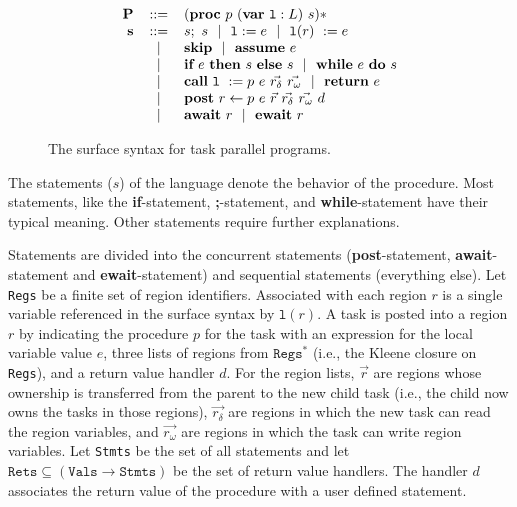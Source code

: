 \begin{figure}
  \begin{center}
\[
  \begin{array}{rcl}
\textbf{P} &::=& (\textbf{proc}~p~(\textbf{var}\ \texttt{l} : L)~s)* \\
\textbf{s} &::=& s;~s \alt \texttt{l} := e \alt \texttt{l}(r)\ := e \\
&\alt& \textbf{skip} \alt  \textbf{assume}~e \\
&\alt& \textbf{if}~e~\textbf{then}~s~\textbf{else}~s \alt \textbf{while}~e~\textbf{do}~s \\
&\alt& \textbf{call}~\texttt{l}\ := p~e~\vec{r_\delta}~\vec{r_\omega} \alt \textbf{return}~e \\
&\alt& \textbf{post}~r \leftarrow p~e~\vec{r}~\vec{r_\delta}~\vec{r_\omega}~d \\
&\alt& \textbf{await}~r \alt \textbf{ewait}~r \\
  \end{array}
\]
  \end{center}
  \caption{The surface syntax for task parallel programs.}
  \vspace{-1em}
  \label{fig:syntax}
\end{figure}

The statements ($s$) of the language denote the behavior of the procedure. Most statements, like the \textbf{if}-statement, \textbf{;}-statement, and \textbf{while}-statement have their typical meaning. Other statements require further explanations.

Statements are divided into the concurrent statements (\textbf{post}-statement, \textbf{await}-statement and \textbf{ewait}-statement) and sequential statements (everything else).  Let \texttt{Regs} be a finite set of region identifiers. Associated with each region $r$ is a single variable referenced in the surface syntax by $\texttt{l}(r)$. A task is posted into a region $r$ by indicating the procedure $p$ for the task with an expression for the local variable value $e$, three lists of regions from $\texttt{Regs}^\ast$ (i.e., the Kleene closure on \texttt{Regs}), and a return value handler $d$. For the region lists, $\vec{r}$ are regions whose ownership is transferred from the parent to the new child task (i.e., the child now owns the tasks in those regions), $\vec{r_\delta}$ are regions in which the new task can read the region variables, and $\vec{r_\omega}$ are regions in which the task can write region variables. Let \texttt{Stmts} be the set of all statements and let $\texttt{Rets} \subseteq (\texttt{Vals} \rightarrow \texttt{Stmts})$ be the set of return value handlers. The handler $d$ associates the return value of the procedure with a user defined statement. 

